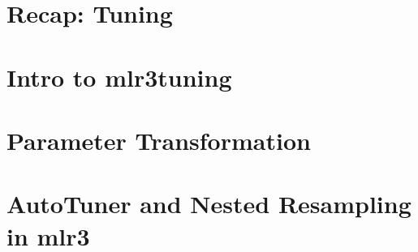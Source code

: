 \documentclass[11pt,compress,t,n
otes=noshow, aspectratio=169, xcolor=table]{beamer}
\begin{document}
\newcommand{\learninggoals}{
\item Basics of mlr3tuning
\item Parameter Transformations
\item Nested Resampling in mlr3}


\section{Recap: Tuning}


\section{Intro to mlr3tuning}


\section{Parameter Transformation}


\section{AutoTuner and Nested Resampling in mlr3}


\endlecture
\end{document}
